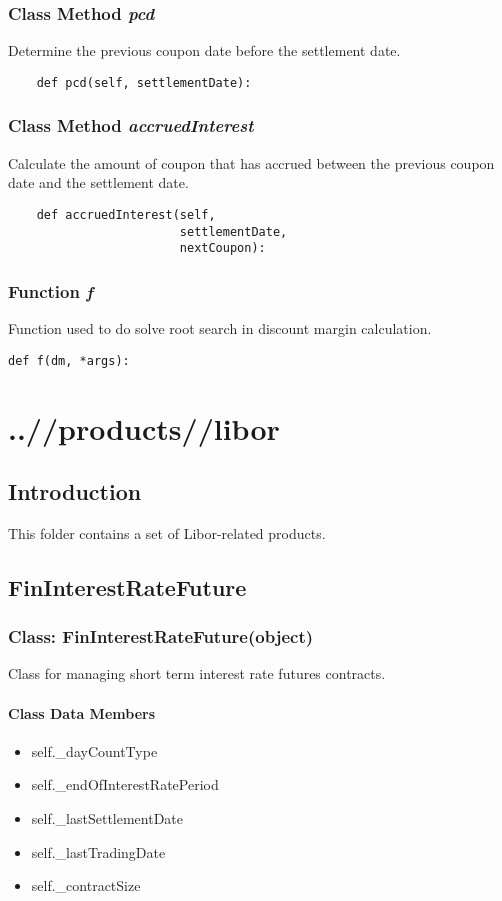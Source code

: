 \documentclass[twoside,11pt]{book}
\begin{document}
\subsection{Class Method {\it pcd}}
Determine the previous coupon date before the settlement date. 

\begin{lstlisting}
    def pcd(self, settlementDate):
\end{lstlisting}

\subsection{Class Method {\it accruedInterest}}
Calculate the amount of coupon that has accrued between the previous coupon date and the settlement date. 

\begin{lstlisting}
    def accruedInterest(self, 
                        settlementDate, 
                        nextCoupon):
\end{lstlisting}

\subsection{Function {\it f}}
Function used to do solve root search in discount margin calculation. 

\begin{lstlisting}
def f(dm, *args):
\end{lstlisting}


\chapter{..//products//libor}
\section{Introduction}
This folder contains a set of Libor-related products.
\newpage
\section{FinInterestRateFuture}

\subsection{Class: FinInterestRateFuture(object)}
Class for managing short term interest rate futures contracts. 

\subsubsection{Class Data Members}
\begin{itemize}
\item{self.\_dayCountType}
\item{self.\_endOfInterestRatePeriod}
\item{self.\_lastSettlementDate}
\item{self.\_lastTradingDate}
\item{self.\_contractSize}
\end{itemize}
\end{document}
